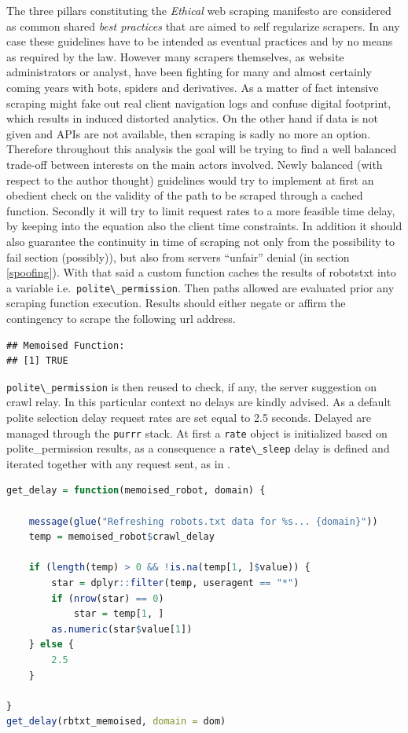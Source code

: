 \documentclass[
  12pt,
  a4paper,
  oneside]{book}
\newcommand{\passthrough}[1]{#1}
\theoremstyle{definition}
\theoremstyle{definition}
\theoremstyle{definition}
\theoremstyle{remark}
\begin{document}
The three pillars constituting the \emph{Ethical} web scraping manifesto \citep{densmore_2019} are considered as common shared \emph{best practices} that are aimed to self regularize scrapers. In any case these guidelines have to be intended as eventual practices and by no means as required by the law. However many scrapers themselves, as website administrators or analyst, have been fighting for many and almost certainly coming years with bots, spiders and derivatives. As a matter of fact intensive scraping might fake out real client navigation logs and confuse digital footprint, which results in induced distorted analytics. On the other hand if data is not given and APIs are not available, then scraping is sadly no more an option.
Therefore throughout this analysis the goal will be trying to find a well balanced trade-off between interests on the main actors involved.
Newly balanced (with respect to the author thought) guidelines would try to implement at first an obedient check on the validity of the path to be scraped through a cached function. Secondly it will try to limit request rates to a more feasible time delay, by keeping into the equation also the client time constraints. In addition it should also guarantee the continuity in time of scraping not only from the possibility to fail section (possibly)), but also from servers ``unfair'' denial (in section \ref{spoofing}).
With that said a custom function caches the results of robotstxt into a variable i.e.~\passthrough{\lstinline!polite\_permission!}. Then paths allowed are evaluated prior any scraping function execution. Results should either negate or affirm the contingency to scrape the following url address.

\begin{lstlisting}
## Memoised Function:
## [1] TRUE
\end{lstlisting}

\passthrough{\lstinline!polite\_permission!} is then reused to check, if any, the server suggestion on crawl relay. In this particular context no delays are kindly advised. As a default polite selection delay request rates are set equal to 2.5 seconds. Delayed are managed through the \passthrough{\lstinline!purrr!} stack. At first a \passthrough{\lstinline!rate!} object is initialized based on polite\_permission results, as a consequence a \passthrough{\lstinline!rate\_sleep!} delay is defined and iterated together with any request sent, as in \citet{rate_delay}.

\begin{lstlisting}[language=R]
get_delay = function(memoised_robot, domain) {
    
    message(glue("Refreshing robots.txt data for %s... {domain}"))
    temp = memoised_robot$crawl_delay
    
    if (length(temp) > 0 && !is.na(temp[1, ]$value)) {
        star = dplyr::filter(temp, useragent == "*")
        if (nrow(star) == 0) 
            star = temp[1, ]
        as.numeric(star$value[1])
    } else {
        2.5
    }
    
}
get_delay(rbtxt_memoised, domain = dom)
\end{lstlisting}
\end{document}
